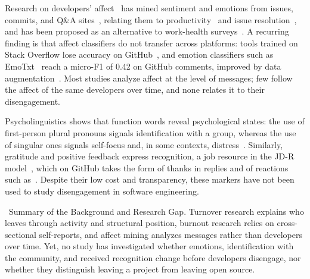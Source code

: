 \begin{description}[leftmargin=0.3cm]
\item[Affect in Software Repositories]
Research on developers' affect~\cite{novielli2019sentiment,sanchez2019taking} has mined sentiment and emotions from issues, commits, and Q\&A sites~\cite{murgia2014developers,calefato2018sentiment,imran2024uncovering}, relating them to productivity~\cite{graziotin2014happy} and issue resolution~\cite{ortu2015bullies}, and has been proposed as an alternative to work-health surveys~\cite{mantyla2016mining}. A recurring finding is that affect classifiers do not transfer across platforms: tools trained on Stack Overflow lose accuracy on GitHub~\cite{novielli2020can}, and emotion classifiers such as EmoTxt~\cite{calefato2017emotxt} reach a micro-F1 of 0.42 on GitHub comments, improved by data augmentation~\cite{imran2022data}. Most studies analyze affect at the level of messages; few follow the affect of the same developers over time, and none relates it to their disengagement.

\item[Identification and Recognition in Language]
Psycholinguistics shows that function words reveal psychological states: the use of first-person plural pronouns signals identification with a group, whereas the use of singular ones signals self-focus and, in some contexts, distress~\cite{tausczik2010psychological}. Similarly, gratitude and positive feedback express recognition, a job resource in the JD-R model~\cite{bakker2007job}, which on GitHub takes the form of thanks in replies and of reactions such as~\faThumbsUp. Despite their low cost and transparency, these markers have not been used to study disengagement in software engineering.
\end{description}

\begin{rqsummary}{\faList\ Summary of the Background and Research Gap.}
Turnover research explains who leaves through activity and structural position, burnout research relies on cross-sectional self-reports, and affect mining analyzes messages rather than developers over time. Yet, no study has investigated whether emotions, identification with the community, and received recognition change before developers disengage, nor whether they distinguish leaving a project from leaving open source.
\end{rqsummary}
